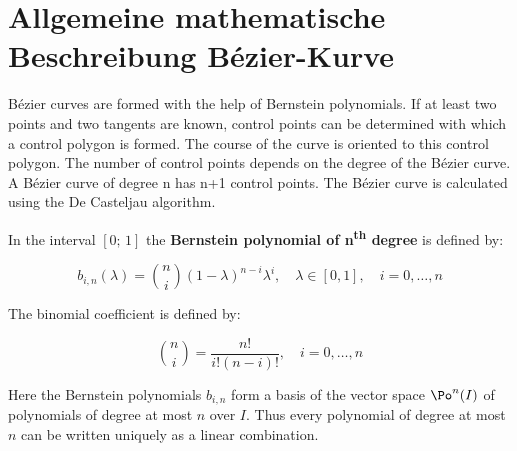 %
%

\section{Allgemeine mathematische Beschreibung Bézier-Kurve}

Bézier curves are formed with the help of Bernstein polynomials. If at least two points and two tangents are known, control points can be determined with which a control polygon is formed. The course of the curve is oriented to this control polygon. The number of control points depends on the degree of the Bézier curve.  A Bézier curve of degree n has n+1 control points.  The Bézier curve is calculated using the De Casteljau algorithm.

\bigskip

\DEF
{
  In the interval $[0;\, 1]$ the \textbf{ Bernstein polynomial of n\textsuperscript{th} degree} is defined by:
	
  \begin{equation}
	b_{i,n}(\lambda) = \binom{n}{i} (1-\lambda)^{n-i} \lambda^{i}, \quad \lambda \in [0,1], \quad i=0,\dots,n
	\label{Bernsteinpolynome}
  \end{equation}
}

\bigskip

\DEF
{
  The binomial coefficient is defined by:
    
 \begin{equation}
   \binom{n}{i}=\frac{n!}{i!(n-i)!}, \quad i=0, \dots ,n  
   \label{Binomialkoeffizient}
 \end{equation}
}	

\bigskip

Here the Bernstein polynomials $b_{i,n}$ form a basis of the vector space $\Po^n(I)$ of polynomials of degree at most $n$ over $I$. Thus every polynomial of degree at most $n$ can be written uniquely as a linear combination.	%
\cite{Farin:2002}

\bigskip


